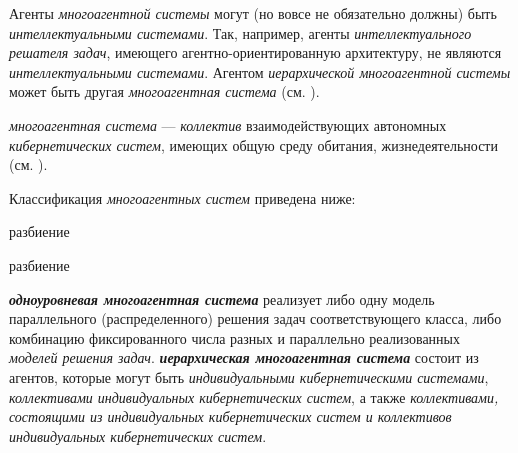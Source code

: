 \begin{SCn}
\end{SCn}


Агенты \textit{многоагентной системы} могут (но вовсе не обязательно должны) быть \textit{интеллектуальными системами}. 
Так, например, агенты \textit{интеллектуального решателя задач}, имеющего агентно-ориентированную архитектуру, не являются \textit{интеллектуальными системами}. Агентом \textit{иерархической многоагентной системы} может быть другая \textit{многоагентная система} (см. ).

\textit{многоагентная система} --- \textit{коллектив} взаимодействующих автономных \textit{кибернетических систем}, имеющих общую среду обитания, жизнедеятельности (см. ). 

Классификация \textit{многоагентных систем} приведена ниже:

\begin{SCn}
\begin{scnrelfromset}{разбиение}
\end{scnrelfromset}
\begin{scnrelfromset}{разбиение}
\end{scnrelfromset}
\end{SCn}

\textbf{\textit{одноуровневая многоагентная система}} реализует либо одну модель параллельного (распределенного) решения задач соответствующего класса, либо комбинацию фиксированного числа разных и параллельно реализованных \textit{моделей решения задач}. 
\textbf{\textit{иерархическая многоагентная система}} состоит из агентов, которые могут быть \textit{индивидуальными кибернетическими системами}, \textit{коллективами индивидуальных кибернетических систем}, а также \textit{коллективами, состоящими из индивидуальных кибернетических систем и коллективов индивидуальных кибернетических систем}.

